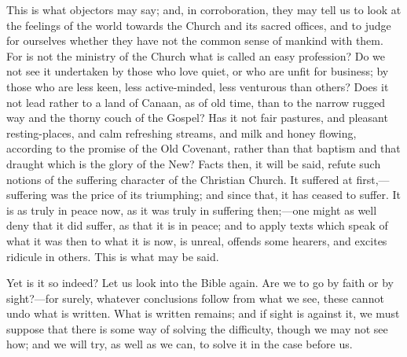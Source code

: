 This is what objectors may say; and, in corroboration, they may
tell us to look at the feelings of the world towards the Church and
its sacred offices, and to judge for ourselves whether they have not
the common sense of mankind with them. For is not the ministry of the
Church what is called an easy profession? Do we not see it undertaken
by those who love quiet, or who are unfit for business; by those who
are less keen, less active-minded, less venturous than others? Does it
not lead rather to a land of Canaan, as of old time, than to the
narrow rugged way and the thorny couch of the Gospel? Has it not fair
pastures, and pleasant resting-places, and calm refreshing streams,
and milk and honey flowing, according to the promise of the Old
Covenant, rather than that baptism and that draught which is the glory
of the New? Facts then, it will be said, refute such notions of the
suffering character of the Christian Church. It suffered at first,—suffering
was the price of its triumphing; and since that, it has ceased to
suffer. It is as truly in peace now, as it was truly in suffering
then;—one might as well deny that it did suffer, as that it is in
peace; and to apply texts which speak of what it was then to what it
is now, is unreal, offends some hearers, and excites ridicule in
others. This is what may be said.

Yet is it so indeed? Let us look into the Bible again. Are we to go
by faith or by sight?—for surely, whatever conclusions follow from
what we see, these cannot undo what is written. What is written
remains; and if sight is against it, we must suppose that there is
some way of solving the difficulty, though we may not see how; and we
will try, as well as we can, to solve it in the case before us.

